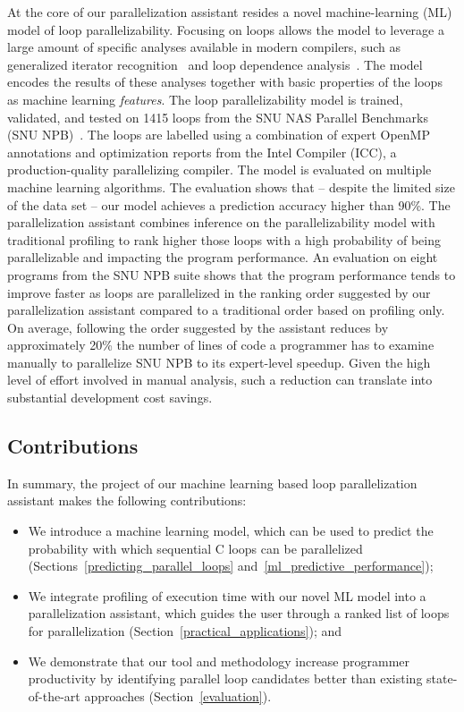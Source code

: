 At the core of our parallelization assistant resides a novel machine-learning (ML) model of loop parallelizability. Focusing on loops allows the model to leverage a large amount of specific analyses available in modern compilers, such as generalized iterator recognition~\cite{Manilov:2018:GPI:3178372.3179511} and loop dependence analysis~\cite{Jensen:2017:ILD:3132652.3095754}. The model encodes the results of these analyses together with basic properties of the loops as machine learning \textit{features}. The loop parallelizability model is trained, validated, and tested on 1415 loops from the SNU NAS Parallel Benchmarks (SNU NPB)~\cite{Seo:2011:PCN:2357490.2358063}. The loops are labelled using a combination of expert OpenMP~\cite{Dagum:1998:OIA:615255.615542} annotations and optimization reports from the Intel \cpp{} Compiler (ICC), a
production-quality parallelizing compiler. The model is evaluated on multiple machine learning algorithms. The evaluation shows that -- despite the limited size of the data set -- our model achieves a prediction accuracy higher than 90\%.\newline\null
\quad The parallelization assistant combines inference on the parallelizability model with traditional profiling to rank higher those loops with a high probability of being parallelizable and impacting the program performance. An evaluation on eight programs from the SNU NPB suite shows that the program performance tends to improve faster as loops are parallelized in the ranking order suggested by our parallelization assistant compared to a traditional order based on profiling only. On average, following the order suggested by the assistant reduces by approximately 20\% the number of lines of code a programmer has to examine manually to parallelize SNU NPB to its expert-level speedup. Given the high level of effort involved in manual analysis, such a reduction can translate into substantial development cost savings.

\subsection{Contributions}
\quad In summary, the project of our machine learning based loop parallelization assistant makes the following contributions:
\begin{itemize}[style=unboxed,leftmargin=0cm]
\itemsep0em
\renewcommand\labelitemi{$\vartriangleright$}
\renewcommand\labelitemii{$\bullet$}
\item We introduce a machine learning model, which can be used to predict the probability with which sequential C loops can be parallelized (Sections~\ref{predicting_parallel_loops} and~\ref{ml_predictive_performance});
\item We integrate profiling of execution time with our novel ML model into a parallelization assistant, which guides the user through a ranked list of loops for parallelization (Section~\ref{practical_applications}); and
\item We demonstrate that our tool and methodology increase programmer productivity by identifying parallel loop candidates better than existing state-of-the-art approaches (Section~\ref{evaluation}).
\end{itemize}

